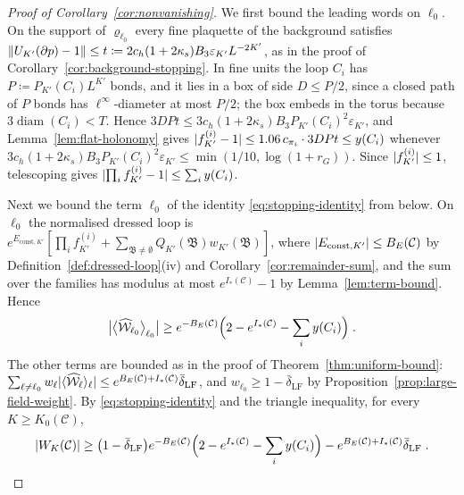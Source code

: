 \documentclass[11pt]{preprint}
\newcommand{\diam}{\operatorname{diam}}
\DeclarePairedDelimiter{\abs}{\lvert}{\rvert}
\DeclarePairedDelimiter{\norm}{\lVert}{\rVert}
\numberwithin{equation}{section}
\theoremstyle{definition}
\theoremstyle{remark}
\theoremstyle{plain}
\begin{document}
\begin{proof}[Proof of Corollary~\ref{cor:nonvanishing}]
We first bound the leading words on $\ell_0$. On the support of $\varrho_{\ell_0}$ every fine plaquette of the background satisfies $\norm{U_{K'}(\partial p) - 1} \leq t \coloneqq 2c_h(1 + 2\kappa_s)B_3\varepsilon_{K'}L^{-2K'}$, as in the proof of Corollary~\ref{cor:background-stopping}. In fine units the loop $C_i$ has $P \coloneqq P_{K'}(C_i)L^{K'}$ bonds, and it lies in a box of side $D \leq P/2$, since a closed path of $P$ bonds has $\ell^\infty$-diameter at most $P/2$; the box embeds in the torus because $3\diam(C_i) < T$. Hence $3DPt \leq 3c_h(1 + 2\kappa_s)B_3P_{K'}(C_i)^2\varepsilon_{K'}$, and Lemma~\ref{lem:flat-holonomy} gives $\abs{f^{(i)}_{K'} - 1} \leq 1.06\,c_{\pi_i} \cdot 3DPt \leq y(C_i)$ whenever $3c_h(1 + 2\kappa_s)B_3P_{K'}(C_i)^2\varepsilon_{K'} \leq \min(1/10, \log(1 + r_G))$. Since $\abs{f^{(i)}_{K'}} \leq 1$, telescoping gives $\abs{\prod_if^{(i)}_{K'} - 1} \leq \sum_iy(C_i)$.

Next we bound the term $\ell_0$ of the identity \eqref{eq:stopping-identity} from below. On $\ell_0$ the normalised dressed loop is $e^{E_{\mathrm{const},K'}}[\prod_if^{(i)}_{K'} + \sum_{\mathfrak B \neq \emptyset}Q_{K'}(\mathfrak B)w_{K'}(\mathfrak B)]$, where $\abs{E_{\mathrm{const},K'}} \leq B_E(\mathcal C)$ by Definition~\ref{def:dressed-loop}(iv) and Corollary~\ref{cor:remainder-sum}, and the sum over the families has modulus at most $e^{I_*(\mathcal C)} - 1$ by Lemma~\ref{lem:term-bound}. Hence
\begin{equation}\label{eq:trivial-term-from-below}
    \bigl\lvert\bigl\langle\widehat{\mathcal W}_{\ell_0}\bigr\rangle_{\ell_0}\bigr\rvert \geq e^{-B_E(\mathcal C)}\Bigl(2 - e^{I_*(\mathcal C)} - \sum_iy(C_i)\Bigr)\;.
\end{equation}
The other terms are bounded as in the proof of Theorem~\ref{thm:uniform-bound}: $\sum_{\ell \neq \ell_0}w_\ell\abs{\langle\widehat{\mathcal W}_\ell\rangle_\ell} \leq e^{B_E(\mathcal C) + I_*(\mathcal C)}\bar\delta_{\mathrm{LF}}$, and $w_{\ell_0} \geq 1 - \bar\delta_{\mathrm{LF}}$ by Proposition~\ref{prop:large-field-weight}. By \eqref{eq:stopping-identity} and the triangle inequality, for every $K \geq K_0(\mathcal C)$,
\begin{equation}\label{eq:nonvanishing-lower}
    \abs{W_K(\mathcal C)} \geq \bigl(1 - \bar\delta_{\mathrm{LF}}\bigr)e^{-B_E(\mathcal C)}\Bigl(2 - e^{I_*(\mathcal C)} - \sum_iy(C_i)\Bigr) - e^{B_E(\mathcal C) + I_*(\mathcal C)}\bar\delta_{\mathrm{LF}}\;.
\end{equation}


\end{proof}
\end{document}
